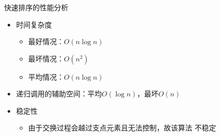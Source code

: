 \begin{frame}
    \frametitle{\insertsectionhead}
    \begin{block}{快速排序的性能分析}
        \begin{itemize}
            \item 时间复杂度
                  \begin{itemize}
                      \item 最好情况：$O(n\log n)$
                      \item 最坏情况：$O(n^{2})$
                      \item 平均情况：$O(n\log n)$
                  \end{itemize}
            \item 递归调用的辅助空间：平均$O(\log n)$，最坏$O(n)$
            \item 稳定性
                  \begin{itemize}
                      \item 由于交换过程会越过支点元素且无法控制，故该算法
                            \alert{不稳定}
                  \end{itemize}
        \end{itemize}
    \end{block}
\end{frame}


